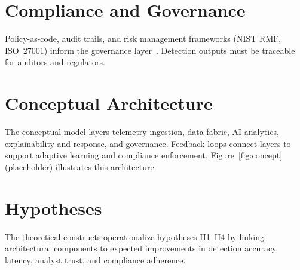 \section{Compliance and Governance}
Policy-as-code, audit trails, and risk management frameworks (NIST RMF, ISO~27001) inform the governance layer~\cite{openpolicyagent2023,nist80053rev5}. Detection outputs must be traceable for auditors and regulators.

\section{Conceptual Architecture}
The conceptual model layers telemetry ingestion, data fabric, AI analytics, explainability and response, and governance. Feedback loops connect layers to support adaptive learning and compliance enforcement. Figure~\ref{fig:concept} (placeholder) illustrates this architecture.

\section{Hypotheses}
The theoretical constructs operationalize hypotheses H1--H4 by linking architectural components to expected improvements in detection accuracy, latency, analyst trust, and compliance adherence.
